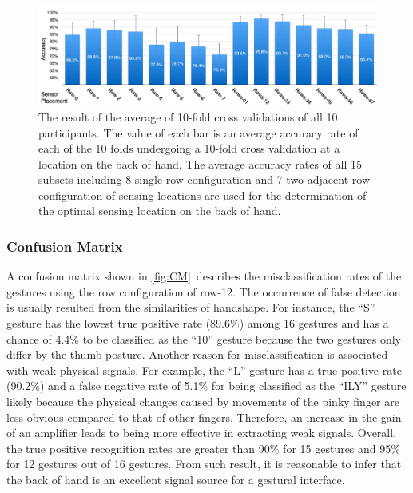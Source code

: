 \documentclass{sigchi}
\begin{document}
\begin{figure}
 \begin{center}
  \includegraphics[width=2\columnwidth]{figures/10FCV_16.pdf}
  \caption{
    The result of the average of 10-fold cross validations of all 10 participants. The value of each bar is an average accuracy rate of each of the 10 folds undergoing a 10-fold cross validation at a location on the back of hand. The average accuracy rates of all 15 subsets including 8 single-row configuration and 7 two-adjacent row configuration of sensing locations are used for the determination of the optimal sensing location on the back of hand.
  }
  \label{fig:accuracy16Gs}
  \end{center}
\end{figure}

\subsubsection{Confusion Matrix}

A confusion matrix shown in \autoref{fig:CM}\ describes the misclassification rates of the gestures using the row configuration of row-12.
The occurrence of false detection is usually resulted from the similarities of handshape.
For instance, the ``S'' gesture has the lowest true positive rate (89.6\%) among 16 gestures and has a chance of 4.4\% to be classified as the ``10'' gesture because the two gestures only differ by the thumb posture.
Another reason for misclassification is associated with weak physical signals.
For example, the ``L'' gesture has a true positive rate (90.2\%) and a false negative rate of 5.1\% for being classified as the ``ILY'' gesture likely because the  physical changes caused by movements of the pinky finger are less obvious compared to that of other fingers. Therefore, an increase in the gain of an amplifier leads to being more effective in extracting weak signals.
Overall, the true positive recognition rates are greater than 90\% for 15 gestures and 95\% for 12 gestures out of 16 gestures. From such result, it is reasonable to infer that the back of hand is an excellent signal source for a gestural interface.
\end{document}
